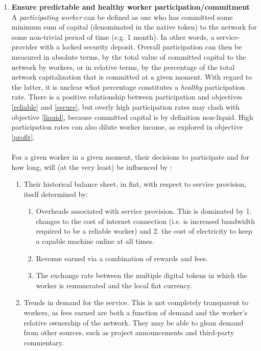 \documentclass[11pt]{amsart}
\begin{document}
\begin{enumerate}
   \\
   \item \textbf{Ensure predictable and healthy worker participation/commitment}\label{part}
   \\
   A \textit{participating worker} can be defined as one who has committed some minimum sum of capital (denominated in the native token) to the network for some non-trivial period of time (e.g. 1 month). In other words, a service-provider with a locked security deposit. Overall participation can then be measured in absolute terms, by the total value of committed capital to the network by workers, or in relative terms, by the percentage of the total network capitalization that is committed at a given moment. With regard to the latter, it is unclear what percentage constitutes a \textit{healthy} participation rate. There is a positive relationship between participation and objectives \ref{reliable} and \ref{secure}, but overly high participation rates may clash with objective \ref{liquid}, because committed capital is by definition non-liquid. High participation rates can also dilute worker income, as explored in objective \ref{profit}.
   \\
   \\
   For a given worker in a given moment, their decisions to participate and for how long, will (at the very least) be influenced by :
   \begin{enumerate}
   \item Their historical balance sheet, in fiat, with respect to service provision, itself determined by: 
   \begin{enumerate}
   \item Overheads associated with service provision. This is dominated by 1. changes to the cost of internet connection (i.e. is increased bandwidth required to be a reliable worker) and 2. the cost of electricity to keep a capable machine online at all times.
   \item Revenue earned via a combination of rewards and fees. 
   \item The exchange rate between the multiple digital tokens in which the worker is remunerated and the local fiat currency.
   \end{enumerate}
   \item Trends in demand for the service. This is not completely transparent to workers, as fees earned are both a function of demand and the worker's relative ownership of the network. They may be able to glean demand from other sources, such as project announcements and third-party commentary.

\end{enumerate}
\end{enumerate}
\end{document}
